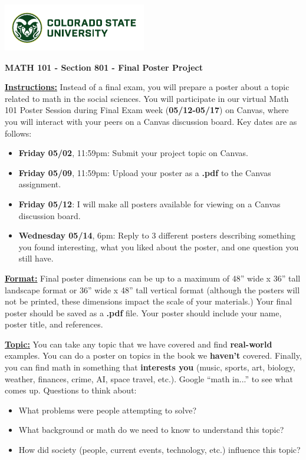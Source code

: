 \documentclass[12pt]{article}
\begin{document}
\includegraphics{CSUSig}

\begin{center}
    {\large\textbf{MATH 101 - Section 801 - Final Poster Project}}
\end{center}
\textbf{\underline{Instructions:}} Instead of a final exam, you will prepare a poster about a topic related to math in the social sciences. You will participate in our virtual Math 101 Poster Session during Final Exam week (\textbf{05/12-05/17}) on Canvas, where you will interact with your peers on a Canvas discussion board. Key dates are as follows:

\begin{itemize}
    \item \textbf{Friday 05/02}, 11:59pm: Submit your project topic on Canvas.
    \item \textbf{Friday 05/09}, 11:59pm: Upload your poster as a \textbf{.pdf} to the Canvas assignment.
    \item \textbf{Friday 05/12}: I will make all posters available for viewing on a Canvas discussion board.
    \item \textbf{Wednesday 05/14}, 6pm: Reply to 3 different posters describing something you found interesting, what you liked about the poster, and one question you still have.
\end{itemize}

\textbf{\underline{Format:}} Final poster dimensions can be up to a maximum of 48'' wide x 36'' tall landscape format or 36'' wide x 48'' tall vertical format (although the posters will not be printed, these dimensions impact the scale of your materials.) Your final poster should be saved as a \textbf{.pdf} file. Your poster should include your name, poster title, and references.

\textbf{\underline{Topic:}}
You can take any topic that we have covered and find \textbf{real-world} examples. You can do a poster on topics in the book we \textbf{haven't} covered. Finally, you can find math in something that \textbf{interests you} (music, sports, art, biology, weather, finances, crime, AI, space travel, etc.). Google ``math in...'' to see what comes up. Questions to think about:
\begin{itemize}
    \item What problems were people attempting to solve?
    \item What background or math do we need to know to understand this topic?
    \item How did society (people, current events, technology, etc.) influence this topic?
\end{itemize}
\end{document}
